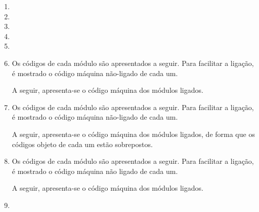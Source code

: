 \begin{enumerate}
    \item

    
    \item

    \item

    \item 
    
    \item


    \item
    Os códigos de cada módulo são apresentados a seguir.
    Para facilitar a ligação, é mostrado 
    o código máquina não-ligado de cada um.

    A seguir, apresenta-se o código máquina dos módulos ligados.

    \item
    Os códigos de cada módulo são apresentados a seguir.
    Para facilitar a ligação, é mostrado 
    o código máquina não-ligado de cada um.

    A seguir, apresenta-se o código máquina dos módulos ligados,
    de forma que os códigos objeto de cada um estão sobrepostos.

    \item
    Os códigos de cada módulo são apresentados a seguir.
    Para facilitar a ligação, é mostrado 
    o código máquina não ligado de cada um.

    A seguir, apresenta-se o código máquina dos módulos ligados.

    \item
\end{enumerate}